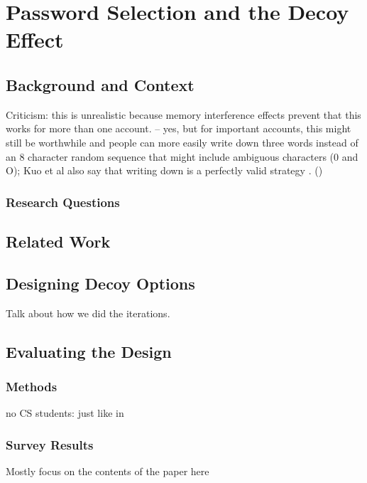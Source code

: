 \chapter[Password Selection and the Decoy Effect]{Password Selection and the Decoy Effect}\label{chap:decoy}


\section{Background and Context}


Criticism: this is unrealistic because memory interference effects prevent that this works for more than one account. -- yes, but for important accounts, this might still be worthwhile and people can more easily write down three words instead of an 8 character random sequence that might include ambiguous characters (0 and O); Kuo et al also say that writing down is a perfectly valid strategy \cite{Kuo2006HumanSelectionMnemonic}. ()

\subsection{Research Questions}

\section{Related Work}

\section{Designing Decoy Options}

Talk about how we did the iterations.

\section{Evaluating the Design}
\subsection{Methods}

no CS students: just like in \cite{Wash2016UnderstandingPasswordChoices}

\subsection{Survey Results}
Mostly focus on the contents of the paper here

